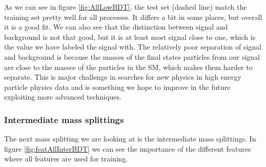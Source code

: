 As we can see in figure \ref{fig:AllLowBDT}, the test set (dashed line) match the training set pretty well for all processes. It differs a bit in some places, but overall it is a good fit. We can also see that the distinction between signal and background is not that good, but it is at least most signal close to one, which is the value we have labeled the signal with. The relatively poor separation of signal and background is because the masses of the final states particles from our signal are close to the masses of the particles in the SM, which makes them harder to separate. This is major challenge in searches for new physics in high energy particle physics data and is something we hope to improve in the future exploiting more advanced techniques.



























\subsubsection{Intermediate mass splittings}

The next mass splitting we are looking at is the intermediate mass splittings. In figure \ref{fig:featAllInterBDT} we can see the importance of the different features where all features are used for training. 

